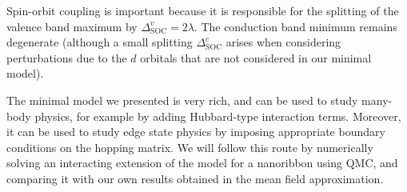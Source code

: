 Spin-orbit coupling is important because it is responsible for the splitting of the valence band maximum by $\Delta_{\text{SOC}}^v = 2 \lambda$.
The conduction band minimum remains degenerate (although a small splitting $\Delta_{\text{SOC}}^c$ arises when considering perturbations due to the $d$ orbitals that are not considered in our minimal model).

The minimal model we presented is very rich, and can be used to study many-body physics, for example by adding Hubbard-type interaction terms.
Moreover, it can be used to study edge state physics by imposing appropriate boundary conditions on the hopping matrix.
We will follow this route by numerically solving  an interacting extension of the model for a nanoribbon using \ac{QMC}, and comparing it with our own results obtained in the mean field approximation.